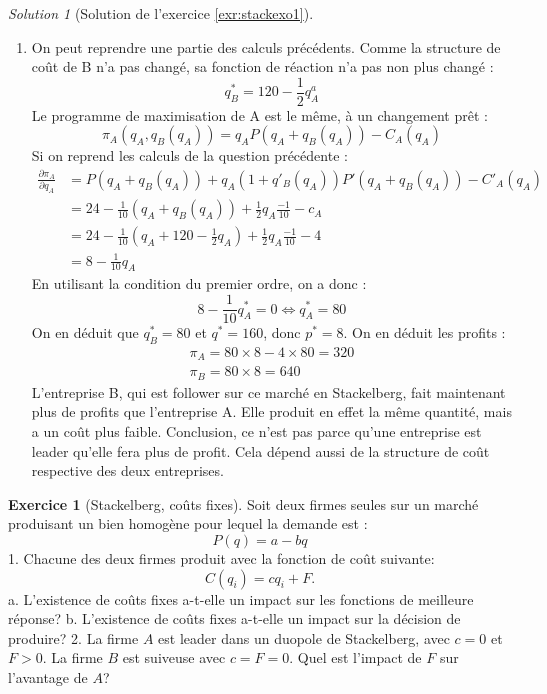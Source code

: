 \documentclass[
]{book}
\theoremstyle{definition}
\theoremstyle{definition}
\theoremstyle{definition}
\newtheorem{exercise}{Exercice}[chapter]
\theoremstyle{definition}
\theoremstyle{remark}
\newtheorem*{solution}{Solution}
\begin{document}
\begin{solution}[Solution de l'exercice \ref{exr:stackexo1}]
\begin{enumerate}
\begin{enumerate}
  \item
    Le profit est plus élevé en Stackelberg pour A, mais plus faible pour B, malgré la totale symétrie de A et B en dehors de leur position sur le marché.
    Cette seule asymétrie profite à A, qui exploite son avantage afin d'augmenter son profit.
  \end{enumerate}
\item
  On peut reprendre une partie des calculs précédents.
  Comme la structure de coût de B n'a pas changé, sa fonction de réaction n'a pas non plus changé :
  \[q_B^*=120-\frac{1}{2}q_A^a\]
  Le programme de maximisation de A est le même, à un changement prêt :
  \[\pi_A(q_A, q_B(q_A))=q_AP(q_A+q_B(q_A))-C_A(q_A)\]
  Si on reprend les calculs de la question précédente :
  \begin{align*}
  \frac{\partial \pi_A}{\partial q_A}&=P(q_A + q_B(q_A))+q_A(1+q'_B(q_A))P'(q_A+q_B(q_A))-C'_A(q_A)\\
  &=24-\frac{1}{10}(q_A+q_B(q_A))+\frac{1}{2}q_A\frac{-1}{10}-c_A\\
  &=24-\frac{1}{10}\left(q_A+120-\frac{1}{2}q_A\right)+\frac{1}{2}q_A\frac{-1}{10}-4\\
  &=8-\frac{1}{10}q_A
  \end{align*}
  En utilisant la condition du premier ordre, on a donc :
  \[8-\frac{1}{10}q_A^*=0\Leftrightarrow q_A^*=80\]
  On en déduit que \(q_B^*=80\) et \(q^*=160\), donc \(p^*=8\).
  On en déduit les profits :
  \begin{gather*}
  \pi_A=80\times 8-4\times 80=320\\
  \pi_B=80\times 8 = 640
  \end{gather*}
  L'entreprise B, qui est follower sur ce marché en Stackelberg, fait maintenant plus de profits que l'entreprise A.
  Elle produit en effet la même quantité, mais a un coût plus faible.
  Conclusion, ce n'est pas parce qu'une entreprise est leader qu'elle fera plus de profit.
  Cela dépend aussi de la structure de coût respective des deux entreprises.
\end{enumerate}

\end{solution}

\begin{exercise}[Stackelberg, coûts fixes]
\protect\hypertarget{exr:stackexo2}{}\label{exr:stackexo2}Soit deux firmes seules sur un marché produisant un bien homogène pour lequel la demande est :
\[P\left(q\right)=a-bq\]
1. Chacune des deux firmes produit avec la fonction de coût suivante:
\[C(q_i)=cq_i+F.\]
a. L'existence de coûts fixes a-t-elle un impact sur les fonctions de meilleure réponse?
b. L'existence de coûts fixes a-t-elle un impact sur la décision de produire?
2. La firme \(A\) est leader dans un duopole de Stackelberg, avec \(c=0\) et \(F>0\). La firme \(B\) est suiveuse avec \(c=F=0\). Quel est l'impact de \(F\) sur l'avantage de \(A\)?
\end{exercise}
\end{document}
